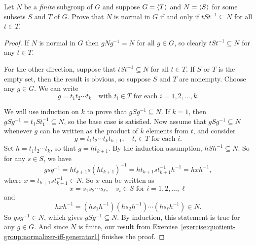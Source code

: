  Let $N$ be a {\em finite} subgroup of $G$ and suppose
$G = \langle{T}\rangle$ and $N = \langle{S}\rangle$ for some subsets $S$ and $T$ of
$G$. Prove that $N$ is normal in $G$ if and only if
$tSt^{-1}\subseteq N$ for all $t\in T$.
\begin{proof}
  If $N$ is normal in $G$ then $gNg^{-1} = N$ for all $g\in G$, so
  clearly $tSt^{-1}\subseteq N$ for any $t\in T$.

  For the other direction, suppose that $tSt^{-1}\subseteq N$ for all
  $t\in T$. If $S$ or $T$ is the empty set, then the result is
  obvious, so suppose $S$ and $T$ are nonempty. Choose any $g\in
  G$. We can write
  \begin{equation*}
    g = t_1t_2\cdots t_k
    \quad\text{with $t_i\in T$ for each $i = 1,2,\dots,k$}.
  \end{equation*}

  We will use induction on $k$ to prove that $gSg^{-1}\subseteq N$. If
  $k = 1$, then $gSg^{-1} = t_1St_1^{-1} \subseteq N$, so the base
  case is satisfied. Now assume that $gSg^{-1}\subseteq N$ whenever
  $g$ can be written as the product of $k$ elements from $t$, and
  consider
  \begin{equation*}
    g = t_1t_2\cdots t_kt_{k+1},
    \quad\text{$t_i\in T$ for each $i$}.
  \end{equation*}
  Set $h = t_1t_2\cdots t_k$, so that $g = ht_{k+1}$. By the induction
  assumption, $hSh^{-1}\subseteq N$. So for any $s\in S$, we have
  \begin{equation*}
    gsg^{-1}
    = ht_{k+1}s(ht_{k+1})^{-1}
    = ht_{k+1}st_{k+1}^{-1}h^{-1}
    = hxh^{-1},
  \end{equation*}
  where $x = t_{k+1}st_{k+1}^{-1}\in N$. So $x$ can be written as
  \begin{equation*}
    x = s_1s_2\cdots s_\ell,
    \quad\text{$s_i\in S$ for $i = 1, 2, \dots, \ell$}
  \end{equation*}
  and
  \begin{equation*}
    hxh^{-1} = (hs_1h^{-1})(hs_2h^{-1})\cdots(hs_\ell h^{-1}) \in N.
  \end{equation*}
  So $gsg^{-1}\in N$, which gives $gSg^{-1}\subseteq N$. By induction,
  this statement is true for any $g\in G$. And since $N$ is finite,
  our result from
  Exercise~\ref{exercise:quotient-group:normalizer-iff-generator1}
  finishes the proof.
\end{proof}

